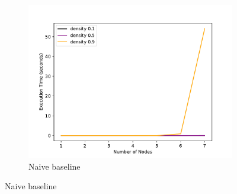 \documentclass[sigplan]{acmart}
\begin{document}
\begin{figure}
    \begin{subfigure}{\linewidth}
      \includegraphics[width=\linewidth]{timeVsSize_10_NaiveChecker.pdf}
      \caption{Naive baseline}
      \label{fig:sfigNa\"{i}veTvsS}
    \end{subfigure}

\end{figure}
\end{document}

